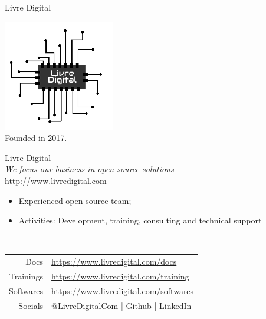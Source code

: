 \documentclass{beamer}
\begin{document}
\begin{frame}{Livre Digital}
  \begin{minipage}{0.25\textwidth}
    \includegraphics[width=\linewidth]{imgs/logo.png}\\
    \small{Founded in 2017.}
  \end{minipage}
  \begin{minipage}{0.65\textwidth}
    Livre Digital\\
    \small{\emph{We focus our business in open source solutions}}\\
    \url{http://www.livredigital.com}
    \begin{itemize}
        \item Experienced open source team;
        \item Activities: Development, training, consulting and technical support
    \end{itemize}
  \end{minipage}
  
  \\[0.65cm]
  
  \begin{tabular}{r l}
  Docs & \url{https://www.livredigital.com/docs}\\
  Trainings & \url{https://www.livredigital.com/training}\\
  Softwares & \url{https://www.livredigital.com/softwares}\\[1cm]
  Socials & \href{https://www.twitter.com/LivreDigitalCom}{@LivreDigitalCom} | \href{https://www.github.com/livredigital}{Github} | \href{https://www.linkedin.com/company/livredigital}{LinkedIn}
  \end{tabular}
\end{frame}
\end{document}
